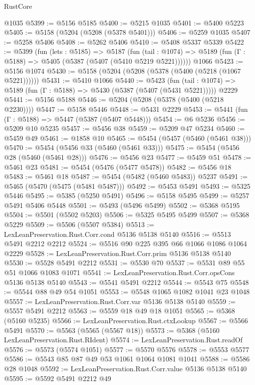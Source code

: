 \begin{lexlean}{RustCore}
\begin{coremodule}
    @1035
@5399 := @5156 @5185
@5400 := @5215 @1035
@5401 := @5400 @5223
@5405 := @5158 (@5204 (@5208 (@5378 @5401)))
@5406 := @5259 @1035
@5407 := @5258 @5406
@5408 := @5262 @5406
@5410 := @5408 @5337 @5339
@5422 := @5399
    (fun (lets : @5185) =>
    @5187
      (fun (tail : @1074) => @5189 (fun (Γ : @5188) => @5405 (@5387 (@5407 (@5410 @5219 @5221))))))
    @1066
@5423 := @5156 @1074
@5430 := @5158 (@5204 (@5208 (@5378 (@5400 (@5218 (@1067 @5221))))))
@5431 := @5410 @1066
@5440 := @5423
    (fun (tail : @1074) => @5189 (fun (Γ : @5188) => @5430 (@5387 (@5407 (@5431 @5221)))))
    @2229
@5441 := @5156 @5188
@5446 := @5204 (@5208 (@5378 (@5400 (@5218 @2230))))
@5447 := @5158 @5446
@5448 := @5431 @2229
@5453 := @5441 (fun (Γ : @5188) => @5447 (@5387 (@5407 @5448)))
@5454 := @6 @5236
@5456 := @5209 @10 @5235
@5457 := @5456 @38
@5459 := @5209 @47 @5234
@5460 := @5459 @49
@5461 := @1858 @10
@5465 := @5454 (@5457 (@5460 (@5461 @38)))
@5470 := @5454 (@5456 @33 (@5460 (@5461 @33)))
@5475 := @5454 (@5456 @28 (@5460 (@5461 @28)))
@5476 := @5456 @23
@5477 := @5459 @51
@5478 := @5461 @23
@5481 := @5454 (@5476 (@5477 @5478))
@5482 := @5456 @18
@5483 := @5461 @18
@5487 := @5454 (@5482 (@5460 @5483)) @5237
@5491 := @5465 (@5470 (@5475 (@5481 @5487)))
@5492 := @5453 @5491
@5493 := @5325 @5446
@5495 := @5385 (@5250 @5491)
@5496 := @5158 @5495
@5499 := @5257 @5491 @5406 @5448
@5501 := @5493 (@5496 @5499)
@5502 := @5368 @5195
@5504 := @5501 (@5502 @5203)
@5506 := @5325 @5495 @5499
@5507 := @5368 @5229
@5509 := @5506 (@5507 @5384)
@5513 := LexLeanPreservation.Rust.Corr.cond @5136 @5138 @5140
@5516 := @5513 @5491 @2212 @2212
@5524 := @5516 @90 @225 @395 @66 @1066 @1086 @1064 @2229
@5528 := LexLeanPreservation.Rust.Corr.prim @5136 @5138 @5140
@5530 := @5528 @5491 @2212
@5531 := @5530 @70
@5537 := @5531 @89 @55 @51 @1066 @1083 @1071
@5541 := LexLeanPreservation.Rust.Corr.opsCons @5136 @5138 @5140
@5543 := @5541 @5491 @2212
@5544 := @5543 @75
@5548 := @5544 @88 @49 @54 @1051
@5553 := @5548 @1065 @1082 @1041 @23 @1048
@5557 := LexLeanPreservation.Rust.Corr.var @5136 @5138 @5140
@5559 := @5557 @5491 @2212
@5563 := @5559 @18 @49 @18 @1051
@5565 := @5368 (@5160 @5235)
@5566 := LexLeanPreservation.Rust.ctxLookup
@5567 := @5566 @5491
@5570 := @5563 (@5565 (@5567 @18))
@5573 := @5368 (@5160 LexLeanPreservation.Rust.RIdent)
@5574 := LexLeanPreservation.Rust.readOf
@5576 := @5573 (@5574 @1051)
@5577 := @5570 @5576
@5578 := @5553 @5577
@5586 := @5543 @85 @87 @49 @53 @1061 @1064 @1081 @1041
@5588 := @5586 @28 @1048
@5592 := LexLeanPreservation.Rust.Corr.value @5136 @5138 @5140
@5595 := @5592 @5491 @2212 @49

\end{coremodule}
\end{lexlean}
